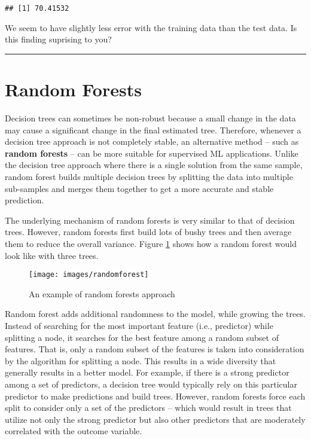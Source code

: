 \documentclass[]{book}
\begin{document}
\begin{verbatim}
## [1] 70.41532
\end{verbatim}

We seem to have slightly less error with the training data than the test data. Is this finding suprising to you?

\begin{center}\rule{0.5\linewidth}{\linethickness}\end{center}

\hypertarget{random-forests}{%
\section{Random Forests}\label{random-forests}}

Decision trees can sometimes be non-robust because a small change in the data may cause a significant change in the final estimated tree. Therefore, whenever a decision tree approach is not completely stable, an alternative method -- such as \textbf{random forests} -- can be more suitable for supervised ML applications. Unlike the decision tree approach where there is a single solution from the same sample, random forest builds multiple decision trees by splitting the data into multiple sub-samples and merges them together to get a more accurate and stable prediction.

The underlying mechanism of random forests is very similar to that of decision trees. However, random forests first build lots of bushy trees and then average them to reduce the overall variance. Figure \ref{fig:fig6-2} shows how a random forest would look like with three trees.

\begin{figure}
\texttt{[image: images/randomforest]} \caption{An example of random forests approach}\label{fig:fig6-2}
\end{figure}

Random forest adds additional randomness to the model, while growing the trees. Instead of searching for the most important feature (i.e., predictor) while splitting a node, it searches for the best feature among a random subset of features. That is, only a random subset of the features is taken into consideration by the algorithm for splitting a node. This results in a wide diversity that generally results in a better model. For example, if there is a strong predictor among a set of predictors, a decision tree would typically rely on this particular predictor to make predictions and build trees. However, random forests force each split to consider only a set of the predictors -- which would result in trees that utilize not only the strong predictor but also other predictors that are moderately correlated with the outcome variable.
\end{document}
